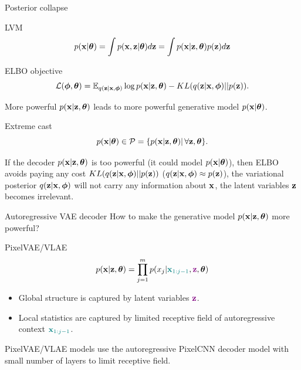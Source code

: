 \begin{frame}{Posterior collapse}
	\begin{block}{LVM}
		\vspace{-0.3cm}
		\[
		p(\mathbf{x} | \boldsymbol{\theta}) = \int p(\mathbf{x}, \mathbf{z} | \boldsymbol{\theta}) d \mathbf{z} = \int p(\mathbf{x} | \mathbf{z}, \boldsymbol{\theta}) p(\mathbf{z}) d \mathbf{z} 
		\]
		\vspace{-0.5cm}
	\end{block}
	\begin{block}{ELBO objective}
		\vspace{-0.3cm}
		\[
		\mathcal{L}(\boldsymbol{\phi}, \boldsymbol{\theta}) = \mathbb{E}_{q(\mathbf{z} | \mathbf{x}, \boldsymbol{\phi})} \log p(\mathbf{x} | \mathbf{z}, \boldsymbol{\theta}) - KL(q(\mathbf{z} | \mathbf{x}, \boldsymbol{\phi}) || p(\mathbf{z})).
		\]
	\end{block}
	More powerful $p(\mathbf{x} | \mathbf{z}, \boldsymbol{\theta})$ leads to more powerful generative model $p(\mathbf{x} | \boldsymbol{\theta})$.
	\begin{block}{Extreme cast}
		\vspace{-0.3cm}
		\[
			p(\mathbf{x} | \boldsymbol{\theta}) \in \mathcal{P} = \{ p(\mathbf{x} | \mathbf{z}, \boldsymbol{\theta}) | \, \forall \mathbf{z}, \boldsymbol{\theta}\}.
		\]
	\end{block}
	If the decoder $p(\mathbf{x} | \mathbf{z}, \boldsymbol{\theta})$ is too powerful (it could  model $p(\mathbf{x} | \boldsymbol{\theta})$), then ELBO avoids paying any cost $KL(q(\mathbf{z}| \mathbf{x}, \boldsymbol{\phi})||p(\mathbf{z}))$ ($q(\mathbf{z}| \mathbf{x}, \boldsymbol{\phi}) \approx p(\mathbf{z})$), the variational posterior $q(\mathbf{z} | \mathbf{x}, \boldsymbol{\phi})$ will not carry any information about $\mathbf{x}$, the latent variables $\mathbf{z}$ becomes irrelevant.
\end{frame}
\begin{frame}{Autoregressive VAE decoder}
	How to make the generative model $p(\mathbf{x} | \mathbf{z}, \boldsymbol{\theta})$ more powerful?
	\begin{block}{PixelVAE/VLAE}
		\vspace{-0.3cm}
		\[
			p(\mathbf{x} | \mathbf{z} , \boldsymbol{\theta}) = \prod_{j=1}^m p(x_j | {\color{teal}\mathbf{x}_{1:j - 1}}, {\color{violet}\mathbf{z}}, \boldsymbol{\theta})
		\]
		\begin{itemize}
			\item Global structure is captured by latent variables ${\color{violet}\mathbf{z}}$.
			\item Local statistics are captured by limited receptive field of autoregressive context ${\color{teal}\mathbf{x}_{1:j - 1}}$.
		\end{itemize}
	\end{block}
	PixelVAE/VLAE models use the autoregressive PixelCNN decoder model with small number of layers to limit receptive field.
\end{frame}
